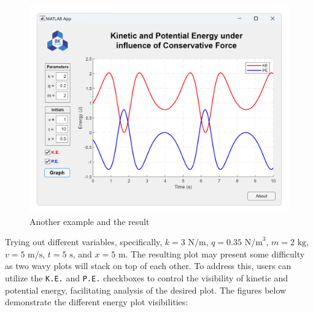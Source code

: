 \documentclass[13pt,a4paper]{report}
\begin{document}
\begin{figure}[!ht]
  \centering
  \includegraphics[scale=0.25]{result1.png}
  \vspace{-0.35cm}
  \caption{Another example and the result}
  \label{fig:result}
\end{figure}

\vspace{0.15cm}
Trying out different variables, specifically, $k=3\text{ N/m}$, $q=0.35\text{ N/m}^3$, $m=2\text{ kg}$, $v=5\text{ m/s}$, $t=5\text{ s}$, and $x=5\text{ m}$. The resulting plot may present some difficulty as two wavy plots will stack on top of each other. To address this, users can utilize the \texttt{K.E.} and \texttt{P.E.} checkboxes to control the visibility of kinetic and potential energy, facilitating analysis of the desired plot. The figures below demonstrate the different energy plot visibilities:
\end{document}
